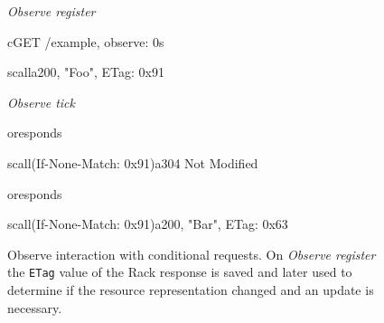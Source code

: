 		\begin{figure}
			\begin{center}
					\begin{sequencediagram}

						\begin{sdblock}{\emph{Observe register}}{}
							\begin{messcall}{c}{GET /example, observe: 0}{s}
								\begin{call}{s}{call}{a}{200, "Foo", ETag: 0x91}
									\postlevel
								\end{call}


							\end{messcall}
						\end{sdblock}

						\begin{sdblock}{\emph{Observe tick}}{}
							\begin{messcall}{o}{respond}{s}
								\begin{call}{s}{call(If-None-Match: 0x91)}{a}{304 Not Modified}
								\end{call}
							\end{messcall}

							\begin{messcall}{o}{respond}{s}
								\begin{call}{s}{call(If-None-Match: 0x91)}{a}{200, "Bar", ETag: 0x63}
									\postlevel
								\end{call}
							\end{messcall}

						\end{sdblock}
					\end{sequencediagram}
			\end{center}
			\caption[Observe interaction with conditional requests]{Observe
				interaction with conditional requests. On \emph{Observe
				register} the \texttt{ETag} value of the Rack response is saved
				and later used to determine if the resource representation
				changed and an update is necessary.}
			\label{img:observe:cache}
		\end{figure}

